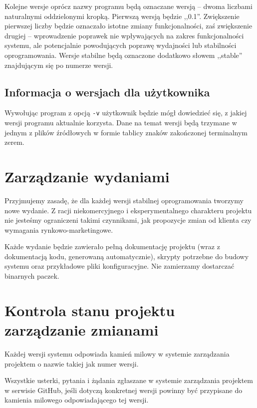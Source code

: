 \documentclass[a4paper]{article}
\begin{document}
Kolejne wersje oprócz nazwy programu będą oznaczane wersją -- dwoma liczbami naturalnymi oddzielonymi kropką. Pierwszą wersją będzie ,,0.1''.
Zwiększenie pierwszej liczby będzie oznaczało istotne zmiany funkcjonalności, zaś zwiększenie drugiej -- wprowadzenie poprawek nie wpływających na zakres funkcjonalności systemu, ale potencjalnie powodujących poprawę wydajności lub stabilności oprogramowania.
Wersje stabilne będą oznaczone dodatkowo słowem ,,stable'' znajdującym się po numerze wersji.

\subsection{Informacja o wersjach dla użytkownika}

Wywołując program z opcją \verb+-v+ użytkownik będzie mógł dowiedzieć się, z jakiej wersji programu aktualnie korzysta. Dane na temat wersji będą trzymane w jednym z plików źródłowych w formie tablicy znaków zakończonej terminalnym zerem. 

\section{Zarządzanie wydaniami}

Przyjmujemy zasadę, że dla każdej wersji stabilnej oprogramowania tworzymy nowe wydanie.
Z racji niekomercyjnego i eksperymentalnego charakteru projektu nie jesteśmy ograniczeni takimi czynnikami, jak propozycje zmian od klienta czy wymagania rynkowo-marketingowe.

Każde wydanie będzie zawierało pełną dokumentację projektu (wraz z dokumentacją kodu, generowaną automatycznie), skrypty potrzebne do budowy systemu oraz przykładowe pliki konfiguracyjne.
Nie zamierzamy dostarczać binarnych paczek.

\section {Kontrola stanu projektu zarządzanie zmianami}

Każdej wersji systemu odpowiada kamień milowy w systemie zarządzania projektem o nazwie takiej jak numer wersji.

Wszystkie usterki, pytania i żądania zgłaszane w systemie zarządzania projektem w serwisie GitHub, jeśli dotyczą konkretnej wersji powinny być przypisane do kamienia milowego odpowiadającego tej wersji.
\end{document}
